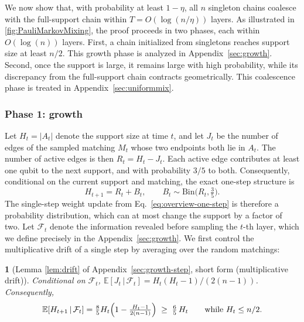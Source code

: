 \documentclass[
    aps,
    superscriptaddress,
    onecolumn,
    10pt,
    prx,
    nofootinbib
]{revtex4-2}
\newcommand{\E}{\mathbb E}
\theoremstyle{namedstatement}
\newtheorem*{namedstatementInner}{}
\theoremstyle{plain}
\newenvironment{restatement}[1]{%
    \begin{namedstatementInner}[#1]%
}{%
    \end{namedstatementInner}%
}
\begin{document}
We now show that, with probability at least $1-\eta$, all $n$ singleton chains coalesce with the full-support chain within $T=O(\log(n/\eta))$ layers. As illustrated in \cref{fig:PauliMarkovMixing}, the proof proceeds in two phases, each within $O(\log{(n)})$ layers. First, a chain initialized from singletons reaches support size at least $n/2$. This growth phase is analyzed in Appendix~\ref{sec:growth}. Second, once the support is large, it remains large with high probability, while its discrepancy from the full-support chain contracts geometrically. This coalescence phase is treated in Appendix~\ref{sec:uniformmix}.
\subsubsection{Phase 1: growth}
Let $H_{t}=|A_{t}|$ denote the support size at time $t$, and let $J_{t}$ be the number of edges of the sampled matching $M_t$ whose two endpoints both lie in $A_{t}$. The number of active edges is then $R_{t}=H_{t}-J_{t}$. Each active edge contributes at least one qubit to the next support, and with
probability $3/5$ to both. Consequently, conditional on the current support and matching, the exact one-step structure is
\begin{equation}\label{eq:overview-one-step}
 H_{t+1}=R_{t}+B_{t},\qquad B_{t}\sim\mathrm{Bin}\bigl(R_{t},\tfrac35\bigr).
\end{equation}
The single-step weight update from Eq.~\eqref{eq:overview-one-step} is therefore a probability distribution, which can at most change the support by a factor of two. Let $\mathcal{F}_t$ denote the information revealed before sampling the $t$-th layer, which we define precisely in the Appendix~\ref{sec:growth}. We first control the multiplicative drift of a single step by averaging over the random matchings:

\begin{restatement}{Lemma \ref{lem:drift} of Appendix~\ref{sec:growth-step}, short form (multiplicative drift)}
Conditional on $\mathcal{F}_{t}$, $\E[J_{t}\,|\,\mathcal{F}_{t}]=H_{t}(H_{t}-1)/(2(n-1))$. Consequently,
\begin{equation}\label{eq:overview-drift}
 \E[H_{t+1}\,|\,\mathcal{F}_{t}]
 =\tfrac85H_{t}\Bigl(1-\tfrac{H_{t}-1}{2(n-1)}\Bigr)
 \;\geq\;\tfrac65\,H_{t}
 \qquad\text{while }H_{t}\leq n/2.
\end{equation}
\end{restatement}
\end{document}
